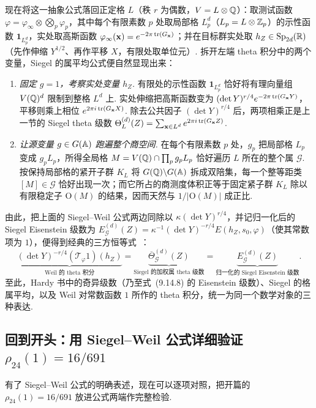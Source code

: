 现在将这一抽象公式落回正定格 $L$（秩 $r$ 为偶数，$V=L\otimes\mathbb{Q}$）：取测试函数 $\varphi=\varphi_\infty\otimes\bigotimes_p\varphi_p$，其中每个有限素数 $p$ 处取局部格 $L_p^d$（$L_p=L\otimes\mathbb{Z}_p$）的示性函数 $\mathbf 1_{L_p^d}$，实处取高斯函数 $\varphi_\infty(\mathbf x)=e^{-2\pi\operatorname{tr}(G_{\mathbf x})}$；并在目标群实处取 $h_Z\in\mathrm{Sp}_{2d}(\mathbb{R})$（先作伸缩 $Y^{1/2}$、再作平移 $X$，有限处取单位元）. 拆开左端 theta 积分中的两个变量，Siegel 的属平均公式便自然显现出来：
\begin{enumerate}
\item \emph{固定 $g=1$，考察实处变量 $h_Z$.} 有限处的示性函数 $\mathbf 1_{L_p^d}$ 恰好将有理向量组 $V(\mathbb{Q})^d$ 限制到整格 $L^d$ 上. 实处伸缩把高斯函数变为 $(\det Y)^{r/4}e^{-2\pi\operatorname{tr}(G_{\mathbf x}Y)}$，平移则乘上相位 $e^{2\pi i\operatorname{tr}(G_{\mathbf x}X)}$. 除去公共因子 $(\det Y)^{r/4}$ 后，两项相乘正是上一节的 Siegel theta 级数 $\Theta_L^{(d)}(Z)=\sum_{\mathbf x\in L^d}e^{2\pi i\operatorname{tr}(G_{\mathbf x}Z)}$.
\item \emph{让源变量 $g\in G(\mathbb{A})$ 跑遍整个商空间.} 在每个有限素数 $p$ 处，$g_p$ 把局部格 $L_p$ 变成 $g_p L_p$，所得全局格 $M=V(\mathbb{Q})\cap\prod_p g_p L_p$ 恰好遍历 $L$ 所在的整个属 $\mathcal G$. 按保持局部格的紧开子群 $K_L$ 将 $G(\mathbb{Q})\backslash G(\mathbb{A})$ 拆成双陪集，每一个整等距类 $[M]\in\mathcal G$ 恰好出现一次；而它所占的商测度体积正等于固定紧子群 $K_L$ 除以有限稳定子 $\mathrm O(M)$ 的结果，因而天然与 $1/|\mathrm O(M)|$ 成正比.
\end{enumerate}

由此，把上面的 Siegel--Weil 公式两边同除以 $\kappa(\det Y)^{r/4}$，并记归一化后的 Siegel Eisenstein 级数为 $E_{\mathcal G}^{(d)}(Z)=\kappa^{-1}(\det Y)^{-r/4}\allowbreak E(h_Z,s_0,\varphi)$（使其常数项为 $1$），便得到经典的三方恒等式~\cite[定理~2.1.3 与定理~2.2.9]{Li2023}：
\[
\underbrace{(\det Y)^{-r/4}(\mathcal T_\varphi 1)(h_Z)}_{\text{Weil 的 theta 积分}}
=\underbrace{\overline{\Theta}_{\mathcal G}^{(d)}(Z)}_{\text{Siegel 的加权属 theta 级数}}
=\underbrace{E_{\mathcal G}^{(d)}(Z)}_{\text{归一化的 Siegel Eisenstein 级数}}.
\]
至此，Hardy 书中的奇异级数（乃至式~(9.14.8) 的 Eisenstein 级数）、Siegel 的格属平均，以及 Weil 对常数函数 $1$ 所作的 theta 积分，统一为同一个数学对象的三种表达.

\subsection{回到开头：用 Siegel--Weil 公式详细验证 \texorpdfstring{$\rho_{24}(1)=16/691$}{rho\_24(1) = 16/691}}

有了 Siegel--Weil 公式的明确表述，现在可以逐项对照，把开篇的 $\rho_{24}(1)=16/691$ 放进公式两端作完整检验.

